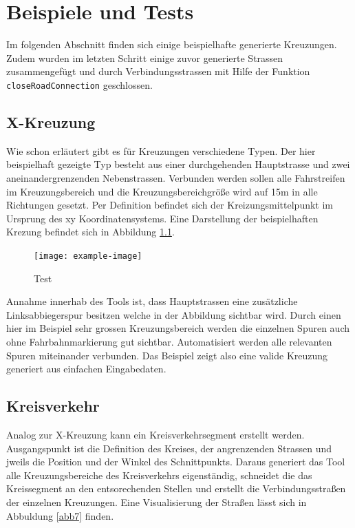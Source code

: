 \chapter{Beispiele und Tests}

Im folgenden Abschnitt finden sich einige beispielhafte generierte Kreuzungen. Zudem wurden im letzten Schritt einige zuvor generierte Strassen zusammengefügt und durch Verbindungsstrassen mit Hilfe der Funktion \texttt{closeRoadConnection} geschlossen. 

\section{X-Kreuzung}
Wie schon erläutert gibt es für Kreuzungen verschiedene Typen. Der hier beispielhaft gezeigte Typ besteht aus einer durchgehenden Hauptstrasse und zwei aneinandergrenzenden Nebenstrassen. Verbunden werden sollen alle Fahrstreifen im Kreuzungsbereich und die Kreuzungsbereichgröße wird auf 15m in alle Richtungen gesetzt. Per Definition befindet sich der Kreizungsmittelpunkt im Ursprung des xy Koordinatensystems. Eine Darstellung der beispielhaften Krezung befindet sich in Abbildung \ref{abb6}.

\begin{figure}[h]
	\flushleft
	\texttt{[image: example-image]}
	\caption{Test \cite{Donges.1982,Werling.2017}}
	\label{abb6}
\end{figure}

Annahme innerhab des Tools ist, dass Hauptstrassen eine zusätzliche Linksabbiegerspur besitzen welche in der Abbildung sichtbar wird. Durch einen hier im Beispiel sehr grossen Kreuzungsbereich werden die einzelnen Spuren auch ohne Fahrbahnmarkierung gut sichtbar. Automatisiert werden alle relevanten Spuren miteinander verbunden. Das Beispiel zeigt also eine valide Kreuzung generiert aus einfachen Eingabedaten.

\section{Kreisverkehr}
Analog zur X-Kreuzung kann ein Kreisverkehrsegment erstellt werden. Ausgangspunkt ist die Definition des Kreises, der angrenzenden Strassen und jweils die Position und der Winkel des Schnittpunkts. Daraus generiert das Tool alle Kreuzungsbereiche des Kreisverkehrs eigenständig, schneidet die das Kreissegment an den entsorechenden Stellen und erstellt die Verbindungsstraßen der einzelnen Kreuzungen. Eine Visualisierung der Straßen lässt sich in Abbuldung \ref{abb7} finden.

